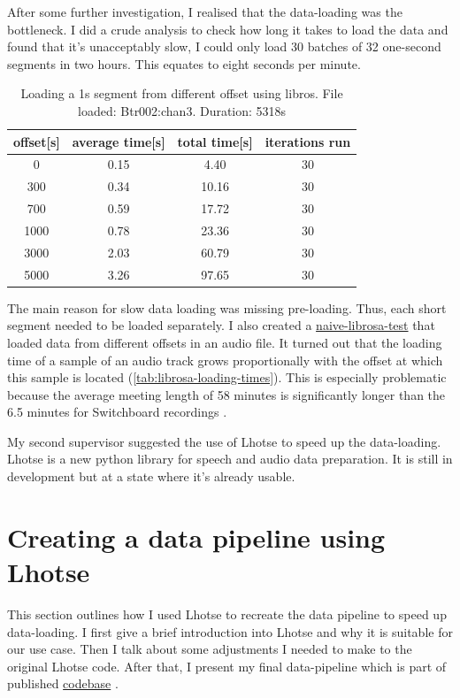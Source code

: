 \documentclass[bsc,frontabs,parskip,deptreport]{infthesis}
\newcommand{\coderepo}{\href{https://github.com/LasseWolter/laughter-detection-icsi}{codebase} }
\begin{document}
After some further investigation, I realised that the data-loading was the bottleneck. I did a crude analysis to check how long it takes to load the data and found that it's unacceptably slow, I could only load 30 batches of 32 one-second segments in two hours. This equates to eight seconds per minute.

\begin{table}[h!]
    \centering
    \begin{tabular}{|c|c|c|c|}
    \hline
    offset[s] & average time[s] & total time[s] & iterations run \\
    \hline
    0  & 0.15 & 4.40 & 30    \\
    300 & 0.34 & 10.16 & 30  \\ 
    700 & 0.59 & 17.72 & 30  \\
    1000 & 0.78 & 23.36 & 30 \\  
    3000 & 2.03 & 60.79 & 30 \\
    5000 & 3.26 & 97.65 & 30 \\
    \hline
    \end{tabular}
    \caption{Loading a 1s segment from different offset using libros. File loaded: Btr002:chan3. Duration: 5318s}
    \label{tab:librosa-loading-times}
\end{table}

The main reason for slow data loading was missing pre-loading. Thus, each short segment needed to be loaded separately. 
I also created a \href{https://github.com/LasseWolter/laughter-detection-icsi/tree/main/misc_scripts}{naive-librosa-test} that loaded data from different offsets in an audio file. It turned out that the loading time of a sample of an audio track grows proportionally with the offset at which this sample is located (\autoref{tab:librosa-loading-times}). 
This is especially problematic because the average meeting length of 58 minutes \citep{icsi-ldc} is significantly longer than the 6.5 minutes for Switchboard recordings \citep{switchboard-ldc}.


My second supervisor suggested the use of Lhotse \citep{zelasko2021lhotse} to speed up the data-loading. Lhotse is a new python library for speech and audio data preparation. It is still in development but at a state where it's already usable.

\section{Creating a data pipeline using Lhotse}
This section outlines how I used Lhotse to recreate the data pipeline to speed up data-loading. I first give a brief introduction into Lhotse and why it is suitable for our use case. Then I talk about some adjustments I needed to make to the original Lhotse code. After that, I present my final data-pipeline which is part of published \coderepo.
\end{document}
